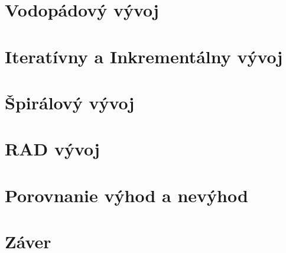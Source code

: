 \documentclass{article}
\begin{document}
\section{Vodopádový vývoj}
\centering
\section{Iteratívny a Inkrementálny vývoj}
\centering
\section{Špirálový vývoj}
\centering
\section{RAD vývoj}
\centering
\section{Porovnanie výhod a nevýhod}
\centering
\section{Záver}
\centering
\end{document}
